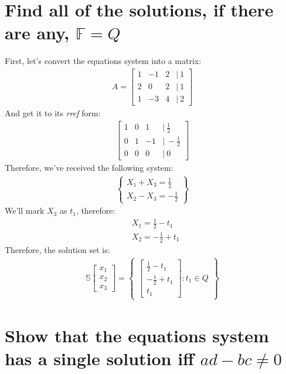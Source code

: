 \documentclass[a4paper, 12pt]{article}
\newcommand{\?}{\stackrel{?}{=}}
\newcommand{\F}{\ensuremath{\mathbb{F}}}
\newcommand{\eq}[1]{\begin{align*}#1\end{align*}}
\begin{document}
\section{Find all of the solutions, if there are any, $\F=Q$}
First, let's convert the equations system into a matrix:
\eq{A=\begin{bmatrix}
    1&-1&2&|~1\\
    2&0&2&|~1\\
    1&-3&4&|~2
\end{bmatrix}}
And get it to its \textit{rref} form:
\eq{\begin{bmatrix}
    1&0&1&|~\frac{1}{2}\\
    0&1&-1&|~-\frac{1}{2}\\
    0&0&0&|~0
\end{bmatrix}}
Therefore, we've received the following system:
\eq{\begin{Bmatrix}
    X_1+X_3=\frac{1}{2}\\
    X_2-X_3=-\frac{1}{2}
\end{Bmatrix}}
We'll mark $X_3$ as $t_1$, therefore:
\eq{&X_1=\frac{1}{2}-t_1\\&X_2=-\frac{1}{2}+t_1}
Therefore, the solution set is:
\eq{
    \mathbb{S}
    \begin{bmatrix}x_1\\x_2\\x_3\end{bmatrix}
    =
    \begin{Bmatrix}
        \begin{bmatrix}\frac{1}{2}-t_1\\-\frac{1}{2}+t_1\\t_1\end{bmatrix}
    :
    t_1\in{Q}
    \end{Bmatrix}
}

\setcounter{section}{12}
\section{Show that the equations system has a single solution iff $ad-bc\neq{0}$}

\end{document}
